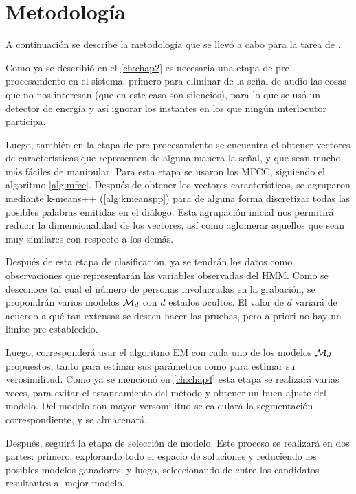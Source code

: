 
\chapter{Metodología}\label{ch:chap5}


A continuación se describe la metodología que se llevó a cabo para la tarea de \sd. 

Como ya se describió en el \autoref{ch:chap2} es necesaria una etapa de pre-procesamiento en el sistema; primero para eliminar de la señal de audio las cosas que no nos interesan (que en este caso son silencios), para lo que se usó un detector de energía y así ignorar los instantes en los que ningún interlocutor participa. 

Luego, también en la etapa de pre-procesamiento se encuentra el obtener vectores de características que representen de alguna manera la señal, y que sean mucho más fáciles de manipular. Para esta etapa se usaron los \ac{MFCC}, siguiendo el algoritmo \autoref{alg:mfcc}.  Después de obtener los vectores característicos, se agruparon mediante k-means++ (\autoref{alg:kmeanspp}) para de alguna forma discretizar todas las posibles palabras emitidas en el diálogo. Esta agrupación inicial nos permitirá reducir la dimensionalidad de los vectores, así como aglomerar aquellos que sean muy similares con respecto a los demás.

Después de esta etapa de clasificación, ya se tendrán los datos como observaciones que representarán las variables observadas del \ac{HMM}. Como se desconoce tal cual el número de personas involucradas en la grabación, se propondrán varios modelos $\mathcal{M}_d$ con $d$ estados ocultos. El valor de $d$ variará de acuerdo a qué tan extensas se deseen hacer las pruebas, pero a priori no hay un límite pre-establecido. 

Luego, corresponderá usar el algoritmo \ac{EM} con cada uno de los modelos $\mathcal{M}_d$ propuestos, tanto para estimar sus parámetros como para estimar su verosimilitud. Como ya se mencionó en \autoref{ch:chap4} esta etapa se realizará varias veces, para evitar el estancamiento del método y obtener un buen ajuste del modelo. Del modelo con mayor versomilitud se calculará la segmentación correspondiente, y se almacenará. 

Después, seguirá la etapa de selección de modelo. Este proceso se realizará en dos partes: primero, explorando todo el espacio de soluciones y reduciendo los posibles modelos ganadores; y luego, seleccionando de entre los candidatos resultantes al mejor modelo.

